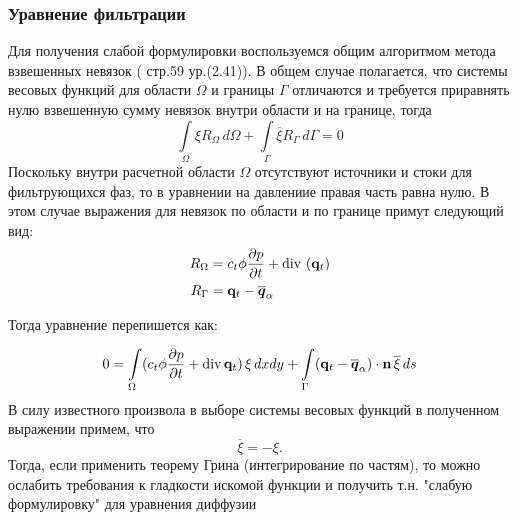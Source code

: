 \subsubsection{Уравнение фильтрации}
Для получения слабой формулировки воспользуемся общим алгоритмом метода взвешенных невязок 
(\cite{Zenkevich_1986} стр.59 ур.(2.41)). В общем случае полагается, что системы весовых
функций для области $\Omega$ и границы $\Gamma$ отличаются и требуется приравнять нулю 
взвешенную сумму невязок внутри области и на границе, тогда
 \begin{equation}\label{eq:residuals}
	\int\limits_\Omega \xi R_\Omega \,d\Omega + \int\limits_\Gamma \overline{\xi}R_\Gamma \,d\Gamma = 0
 \end{equation} 
Поскольку внутри расчетной области $\Omega$ отсутствуют источники и стоки для фильтрующихся фаз,
то в уравнении на давлениие  правая часть равна нулю. В этом случае выражения для невязок 
по области и по границе примут следующий вид:
\begin{equation}
	\begin{aligned}
		R_\Omega &= c_t\phi \dfrac{\partial p}{\partial t} + \operatorname{div}\, \left( \mathbf{q}_t \right)\\
		R_\Gamma &= \mathbf{q}_t - \overline{\bm{q}}_{\alpha}
	\end{aligned}
\end{equation}

Тогда уравнение  перепишется как:

\begin{equation}
	\displaystyle 0=\int\limits_\Omega  (c_t\phi \dfrac{\partial p}{\partial t} + \operatorname{div}{\mathbf{q}_t}) \,\xi \,dx dy
	+ \int\limits_{\Gamma} (\mathbf{q}_t - \overline{\bm{q}}_{\alpha})\cdot \mathbf{n} \, \overline{\xi} \,ds
\end{equation}
В силу известного произвола в выборе системы весовых функций в полученном выражении примем, что
\begin{equation}
	\overline{\xi} = -\xi.
\end{equation}
Тогда, если применить теорему Грина (интегрирование по частям), то можно ослабить требования к гладкости
искомой функции и получить т.н. "слабую формулировку" для уравнения  диффузии 

